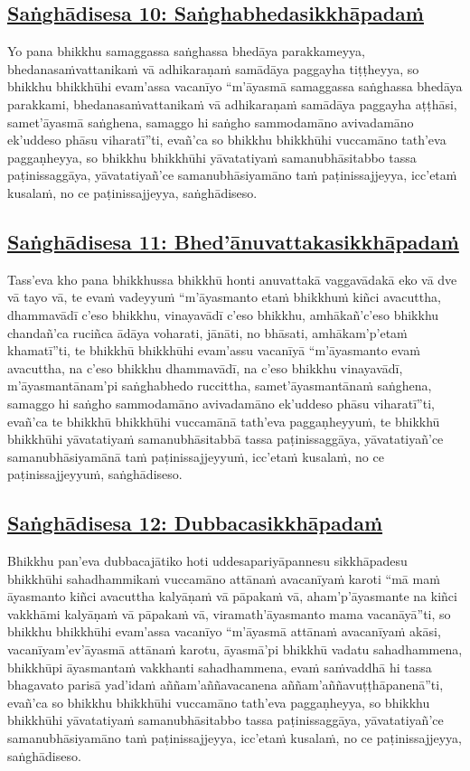 \subsection*{\hyperref[comm10]{Saṅghādisesa 10: Saṅghabhedasikkhāpadaṁ}}
\label{sd10}
Yo pana bhikkhu samaggassa saṅghassa bhedāya parakkameyya, bhedanasaṁvattanikaṁ vā adhikaraṇaṁ samādāya paggayha tiṭṭheyya, so bhikkhu bhikkhūhi evam'assa vacanīyo “m'āyasmā samaggassa saṅghassa bhedāya parakkami, bhedanasaṁvattanikaṁ vā adhikaraṇaṁ samādāya paggayha aṭṭhāsi, samet'āyasmā saṅghena, samaggo hi saṅgho sammodamāno avivadamāno ek'uddeso phāsu viharatī”ti, evañ'ca so bhikkhu bhikkhūhi vuccamāno tath'eva paggaṇheyya, so bhikkhu bhikkhūhi yāvatatiyaṁ samanubhāsitabbo tassa paṭinissaggāya, yāvatatiyañ'ce samanubhāsiyamāno taṁ paṭinissajjeyya, icc'etaṁ kusalaṁ, no ce paṭinissajjeyya, saṅghādiseso.

\subsection*{\hyperref[comm11]{Saṅghādisesa 11: Bhed'ānuvattakasikkhāpadaṁ}}
\label{sd11}
Tass'eva kho pana bhikkhussa bhikkhū honti anuvattakā vaggavādakā eko vā dve vā tayo vā, te evaṁ vadeyyuṁ “m'āyasmanto etaṁ bhikkhuṁ kiñci avacuttha, dhammavādī c'eso bhikkhu, vinayavādī c'eso bhikkhu, amhākañ'c'eso bhikkhu chandañ'ca ruciñca ādāya voharati, jānāti, no bhāsati, amhākam'p'etaṁ khamatī”ti, te bhikkhū bhikkhūhi evam'assu vacanīyā “m'āyasmanto evaṁ avacuttha, na c'eso bhikkhu dhammavādī, na c'eso bhikkhu vinayavādī, m'āyasmantānam'pi saṅghabhedo ruccittha, samet'āyasmantānaṁ saṅghena, samaggo hi saṅgho sammodamāno avivadamāno ek'uddeso phāsu viharatī”ti, evañ'ca te bhikkhū bhikkhūhi vuccamānā tath'eva paggaṇheyyuṁ, te bhikkhū bhikkhūhi yāvatatiyaṁ samanubhāsitabbā tassa paṭinissaggāya, yāvatatiyañ'ce samanubhāsiyamānā taṁ paṭinissajjeyyuṁ, icc'etaṁ kusalaṁ, no ce paṭinissajjeyyuṁ, saṅghādiseso.

\subsection*{\hyperref[comm12]{Saṅghādisesa 12: Dubbacasikkhāpadaṁ}}
\label{sd12}
Bhikkhu pan'eva dubbacajātiko hoti uddesapariyāpannesu sikkhāpadesu bhikkhūhi sahadhammikaṁ vuccamāno attānaṁ avacanīyaṁ karoti “mā maṁ āyasmanto kiñci avacuttha kalyāṇaṁ vā pāpakaṁ vā, aham'p'āyasmante na kiñci vakkhāmi kalyāṇaṁ vā pāpakaṁ vā, viramath'āyasmanto mama vacanāyā”ti, so bhikkhu bhikkhūhi evam'assa vacanīyo “m'āyasmā attānaṁ avacanīyaṁ akāsi, vacanīyam'ev'āyasmā attānaṁ karotu, āyasmā'pi bhikkhū vadatu sahadhammena, bhikkhūpi āyasmantaṁ vakkhanti sahadhammena, evaṁ saṁvaddhā hi tassa bhagavato parisā yad'idaṁ aññam'aññavacanena aññam'aññavuṭṭhāpanenā”ti, evañ'ca so bhikkhu bhikkhūhi vuccamāno tath'eva paggaṇheyya, so bhikkhu bhikkhūhi yāvatatiyaṁ samanubhāsitabbo tassa paṭinissaggāya, yāvatatiyañ'ce samanubhāsiyamāno taṁ paṭinissajjeyya, icc'etaṁ kusalaṁ, no ce paṭinissajjeyya, saṅghādiseso.

